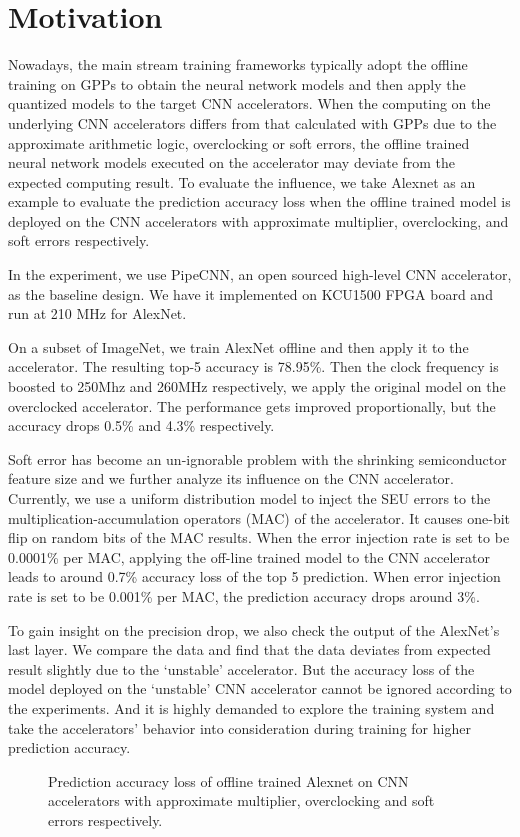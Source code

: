 \section{Motivation} \label{sec:motivation}
Nowadays, the main stream training frameworks typically adopt the offline training
on GPPs to obtain the neural network models and then apply the quantized models to the 
target CNN accelerators. When the computing on the underlying CNN accelerators differs
from that calculated with GPPs due to the approximate arithmetic logic, overclocking or 
soft errors, the offline trained neural network models executed on the accelerator 
may deviate from the expected computing result. To evaluate the influence, 
we take Alexnet as an example to evaluate the prediction 
accuracy loss when the offline trained model is deployed on the CNN 
accelerators with approximate multiplier, overclocking, and soft errors respectively. 

In the experiment, we use PipeCNN\cite{pipecnn_2}, an open sourced high-level CNN accelerator, 
as the baseline design. We have it implemented 
on KCU1500 FPGA board and run at 210 MHz for AlexNet. 

On a subset of ImageNet, we train AlexNet offline 
and then apply it to the accelerator. The resulting top-5 accuracy is 78.95\%. Then the clock 
frequency is boosted to 250Mhz and 260MHz respectively, we apply the original model on 
the overclocked accelerator. The performance gets improved proportionally, but the 
accuracy drops 0.5\% and 4.3\% respectively.

  Soft error has become an un-ignorable problem with the shrinking semiconductor 
feature size and we further analyze its influence on the CNN accelerator. 
Currently, we use a uniform distribution model to inject the SEU errors to the 
multiplication-accumulation operators (MAC) of the accelerator. It causes one-bit 
flip on random bits of the MAC results. When the error injection rate is set to 
be 0.0001\% per MAC, applying the off-line trained model to the CNN accelerator 
leads to around 0.7\% accuracy loss of the top 5 prediction. When error injection 
rate is set to be 0.001\% per MAC, the prediction accuracy drops around 3\%.

  To gain insight on the precision drop, we also check the output of the AlexNet’s last 
layer. We compare the data and find that the data deviates from expected result slightly 
due to the ‘unstable’ accelerator. But the accuracy loss of the model deployed on 
the ‘unstable’ CNN accelerator cannot be ignored according to the experiments. 
And it is highly demanded to explore the training 
system and take the accelerators’ behavior into consideration during training for higher prediction accuracy.

\begin{figure}
    \caption{Prediction accuracy loss of offline trained Alexnet on CNN accelerators with approximate multiplier, overclocking and soft errors respectively.}
\label{fig:loss}
\vspace{-1em}
\end{figure}


